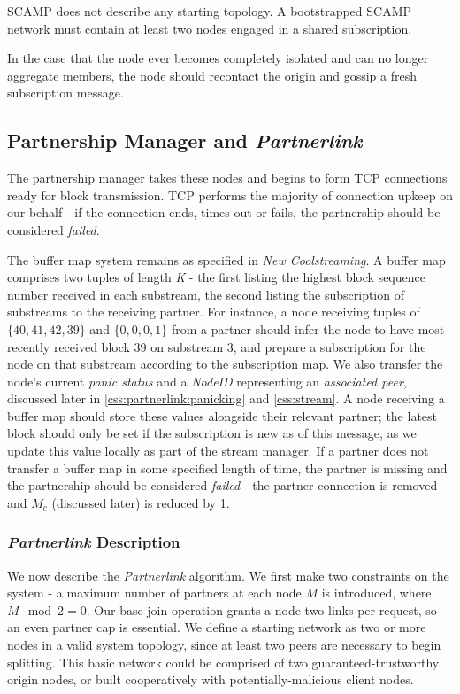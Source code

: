 \documentclass[12pt,a4paper]{article}
\begin{document}
SCAMP does not describe any starting topology. A bootstrapped SCAMP network must contain at least two nodes engaged in a shared subscription.

In the case that the node ever becomes completely isolated and can no longer aggregate members, the node should recontact the origin and gossip a fresh subscription message.

\subsection{Partnership Manager and \textit{Partnerlink}} \label{css:partnerlink}
The partnership manager takes these nodes and begins to form TCP connections ready for block transmission. TCP performs the majority of connection upkeep on our behalf - if the connection ends, times out or fails, the partnership should be considered \textit{failed}. 

The buffer map system remains as specified in \textit{New Coolstreaming}. A buffer map comprises two tuples of length \textit{K} - the first listing the highest block sequence number received in each substream, the second listing the subscription of substreams to the receiving partner. For instance, a node receiving tuples of \(\{40, 41, 42, 39\}\) and \(\{0, 0, 0, 1\}\) from a partner should infer the node to have most recently received block 39 on substream 3, and prepare a subscription for the node on that substream according to the subscription map. We also transfer the node's current \textit{panic status} and a \textit{NodeID} representing an \textit{associated peer}, discussed later in \ref{css:partnerlink:panicking} and \ref{css:stream}. A node receiving a buffer map should store these values alongside their relevant partner; the latest block should only be set if the subscription is new as of this message, as we update this value locally as part of the stream manager. If a partner does not transfer a buffer map in some specified length of time, the partner is missing and the partnership should be considered \textit{failed} - the partner connection is removed and \(M_c\) (discussed later) is reduced by 1.

\subsubsection{\textit{Partnerlink} Description} \label{css:partnerlink:description}
We now describe the \textit{Partnerlink} algorithm. We first make two constraints on the system - a maximum number of partners at each node \(M\) is introduced, where \(M\mod{2} = 0\). Our base join operation grants a node two links per request, so an even partner cap is essential. We define a starting network as two or more nodes in a valid system topology, since at least two peers are necessary to begin splitting. This basic network could be comprised of two guaranteed-trustworthy origin nodes, or built cooperatively with potentially-malicious client nodes.
\end{document}
